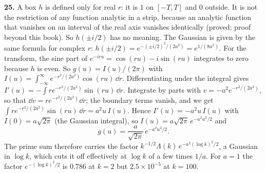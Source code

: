 \textbf{25.} A box $h$ is defined only for real $r$: it is $1$ on $[-T,T]$ and $0$ outside. It is not the restriction of any function analytic in a strip, because an analytic function that vanishes on an interval of the real axis vanishes identically (proved; proof beyond this book). So $h(\pm i/2)$ has no meaning. The Gaussian is given by the same formula for complex $r$: $h(\pm i/2)=e^{-(\pm i/2)^2/(2a^2)}=e^{1/(8a^2)}$. For the transform, the sine part of $e^{-iru}=\cos(ru)-i\sin(ru)$ integrates to zero because $h$ is even. So $g(u)=I(u)/(2\pi)$ with $I(u)=\int_{-\infty}^{\infty}e^{-r^2/(2a^2)}\cos(ru)\,\dd r$. Differentiating under the integral gives $I'(u)=-\int re^{-r^2/(2a^2)}\sin(ru)\,\dd r$. Integrate by parts with $v=-a^2e^{-r^2/(2a^2)}$, so that $\dd v=re^{-r^2/(2a^2)}\dd r$; the boundary terms vanish, and we get $\int re^{-r^2/(2a^2)}\sin(ru)\,\dd r=a^2u\,I(u)$. Hence $I'(u)=-a^2u\,I(u)$ with $I(0)=a\sqrt{2\pi}$ (the Gaussian integral), so $I(u)=a\sqrt{2\pi}\,e^{-a^2u^2/2}$ and
\[
g(u)=\frac{a}{\sqrt{2\pi}}\,e^{-a^2u^2/2}.
\]
The prime sum therefore carries the factor $k^{-1/2}\Lambda(k)\,e^{-a^2(\log k)^2/2}$, a Gaussian in $\log k$, which cuts it off effectively at $\log k$ of a few times $1/a$. For $a=1$ the factor $e^{-(\log k)^2/2}$ is $0.786$ at $k=2$ but $2.5\times10^{-5}$ at $k=100$.
